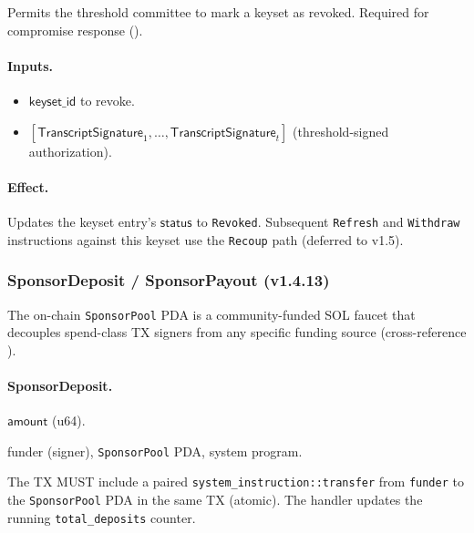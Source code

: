 Permits the threshold committee to mark a keyset as revoked. Required for compromise response ().

\paragraph{Inputs.}
\begin{itemize}[leftmargin=2em,itemsep=0pt]
  \item $\mathsf{keyset\_id}$ to revoke.
  \item $[\mathsf{TranscriptSignature}_1, \ldots, \mathsf{TranscriptSignature}_t]$ (threshold-signed authorization).
\end{itemize}

\paragraph{Effect.} Updates the keyset entry's $\mathsf{status}$ to \texttt{Revoked}. Subsequent \texttt{Refresh} and \texttt{Withdraw} instructions against this keyset use the \texttt{Recoup} path (deferred to v1.5).

\subsubsection{SponsorDeposit / SponsorPayout (v1.4.13)}
\label{sec:onchain-instr-sponsor}

The on-chain \texttt{SponsorPool} PDA is a community-funded SOL
faucet that decouples spend-class TX signers from any specific
funding source (cross-reference ).

\paragraph{SponsorDeposit.}
\begin{description}[leftmargin=2em,itemsep=0pt]
  \item[Inputs] $\mathsf{amount}$ (u64).
  \item[Accounts] funder (signer), \texttt{SponsorPool} PDA, system program.
  \item[Effect] The TX MUST include a paired \texttt{system\_instruction::transfer}
    from \texttt{funder} to the \texttt{SponsorPool} PDA in the same TX (atomic).
    The handler updates the running \texttt{total\_deposits} counter.
\end{description}

